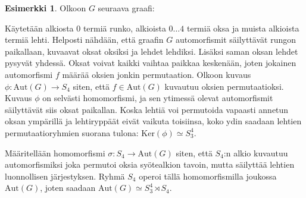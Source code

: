 \documentclass[a4paper, 12pt]{article}
\theoremstyle{definition}
\newtheorem{example}[mydef]{Esimerkki}
\theoremstyle{plain}
\begin{document}
\begin{example}
Olkoon $G$ seuraava graafi:

\begin{center}
\end{center}

Käytetään alkiosta $0$ termiä runko, alkioista $0 \dots 4$ termiä oksa ja muista alkioista termiä lehti. Helposti nähdään, että graafin $G$ automorfismit säilyttävät rungon paikallaan, kuvaavat oksat oksiksi ja lehdet lehdiksi. Lisäksi saman oksan lehdet pysyvät yhdessä. Oksat voivat kaikki vaihtaa paikkaa keskenään, joten jokainen automorfismi $f$ määrää oksien jonkin permutaation. 
Olkoon kuvaus $\phi: \mathrm{Aut}(G) \rightarrow S_4$ siten, että $f \in \mathrm{Aut}(G)$ kuvautuu oksien permutaatioksi. Kuvaus $\phi$ on selvästi homomorfismi, ja sen ytimessä olevat automorfismit säilyttävät siis oksat paikallan. Koska lehtiä voi permutoida vapaasti annetun oksan ympärillä ja lehtiryppäät eivät vaikuta toisiinsa, koko ydin saadaan lehtien permutaatioryhmien suorana tulona: $\mathrm{Ker}(\phi) \simeq S_3^4$. 

Määritellään homomorfismi $\sigma: S_4 \rightarrow \mathrm{Aut}(G)$ siten, että $S_4$:n alkio kuvautuu automorfismiksi joka permutoi oksia syötealkion tavoin, mutta säilyttää lehtien luonnollisen järjestyksen. Ryhmä $S_4$ operoi tällä homomorfismilla joukossa $\mathrm{Aut}(G)$, joten saadaan $\mathrm{Aut}(G) \simeq S_3^4 \rtimes S_4$.
\end{example}
\end{document}
